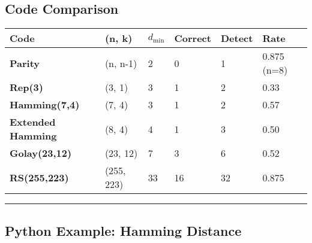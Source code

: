 \subsection{Code Comparison}\label{code-comparison}

{\def\LTcaptype{} %
\begin{longtable}[]{@{}llllll@{}}
\toprule\noalign{}
Code & (n, k) & \(d_{\min}\) & Correct & Detect & Rate \\
\midrule\noalign{}
\endhead
\bottomrule\noalign{}
\endlastfoot
\textbf{Parity} & (n, n-1) & 2 & 0 & 1 & 0.875 (n=8) \\
\textbf{Rep(3)} & (3, 1) & 3 & 1 & 2 & 0.33 \\
\textbf{Hamming(7,4)} & (7, 4) & 3 & 1 & 2 & 0.57 \\
\textbf{Extended Hamming} & (8, 4) & 4 & 1 & 3 & 0.50 \\
\textbf{Golay(23,12)} & (23, 12) & 7 & 3 & 6 & 0.52 \\
\textbf{RS(255,223)} & (255, 223) & 33 & 16 & 32 & 0.875 \\
\end{longtable}
}

\begin{center}\rule{0.5\linewidth}{0.5pt}\end{center}

\subsection{Python Example: Hamming
Distance}\label{python-example-hamming-distance}

